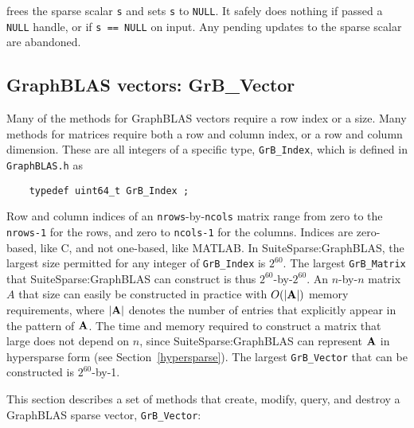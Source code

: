 \documentclass[12pt]{article}
\begin{document}
\noindent
frees the sparse scalar \verb's' and sets \verb's' to \verb'NULL'.  It safely
does nothing if passed a \verb'NULL' handle, or if \verb's == NULL' on input.
Any pending updates to the sparse scalar are abandoned.

\newpage
\subsection{GraphBLAS vectors: {\sf GrB\_Vector}} %
\label{vector}

Many of the methods for GraphBLAS vectors require a row index or a size.  Many
methods for matrices require both a row and column index, or a row and column
dimension.  These are all integers of a specific type, \verb'GrB_Index',
which is defined in \verb'GraphBLAS.h' as

    {\footnotesize
    \begin{verbatim}
    typedef uint64_t GrB_Index ; \end{verbatim}}

Row and column indices of an \verb'nrows'-by-\verb'ncols' matrix range from
zero to the \verb'nrows-1' for the rows, and zero to \verb'ncols-1' for the
columns.  Indices are zero-based, like C, and not one-based, like MATLAB.  In
SuiteSparse:GraphBLAS, the largest size permitted for any integer of
\verb'GrB_Index' is $2^{60}$.  The largest \verb'GrB_Matrix' that
SuiteSparse:GraphBLAS can construct is thus $2^{60}$-by-$2^{60}$.  An
$n$-by-$n$ matrix $A$ that size can easily be constructed in practice with
$O(|{\bf A}|)$ memory requirements, where $|{\bf A}|$ denotes the number of
entries that explicitly appear in the pattern of ${\bf A}$.  The time and
memory required to construct a matrix that large does not depend on $n$, since
SuiteSparse:GraphBLAS can represent ${\bf A}$ in hypersparse form (see
Section~\ref{hypersparse}).  The largest \verb'GrB_Vector' that can be
constructed is $2^{60}$-by-1.

This section describes a set of methods that create, modify, query,
and destroy a GraphBLAS sparse vector, \verb'GrB_Vector':
\end{document}
